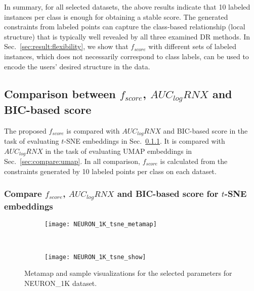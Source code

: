 In summary, for all selected datasets, the above results indicate that 10 labeled instances per class is enough for obtaining a stable score.
The generated constraints from labeled points can capture the class-based relationship (local structure) that is typically well revealed by all three examined DR methods.
In Sec.~\ref{sec:result:flexibility}, we show that $f_{score}$ with different sets of labeled instances, which does not necessarily correspond to class labels,
can be used to encode the users' desired structure in the data.


\subsection{Comparison between $f_{score}$, $AUC_{log}RNX$ and BIC-based score}\label{sec:result:bo}

The proposed $f_{score}$ is compared with $AUC_{log}RNX$ and BIC-based score in the task of evaluating $t$-SNE embeddings in Sec.~\ref{sec:compare:tnse}.
It is compared with $AUC_{log}RNX$ in the task of evaluating UMAP embeddings in Sec.~\ref{sec:compare:umap}.
In all comparison, $f_{score}$ is calculated from the constraints generated by 10 labeled points per class on each dataset.

\subsubsection{Compare $f_{score}$, $AUC_{log}RNX$ and BIC-based score for $t$-SNE embeddings}\label{sec:compare:tnse}

\begin{figure*}[ht!]
    \centering
    \begin{subfigure}[b]{.8\linewidth}
        \texttt{[image: NEURON\_1K\_tsne\_metamap]}
    \end{subfigure}
    ~
    \begin{subfigure}[b]{.8\linewidth}
        \texttt{[image: NEURON\_1K\_tsne\_show]}
    \end{subfigure}
    \caption{Metamap and sample visualizations for the selected parameters for {NEURON\_1K} dataset.}
    \label{fig:tsne:meta:NEURON1K}
\end{figure*}


